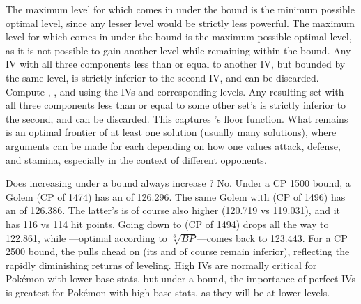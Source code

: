 The maximum level for which  comes in under the bound is the
 minimum possible optimal level, since any lesser level would be strictly less
 powerful.
The maximum level for which  comes in under the bound is the
 maximum possible optimal level, as it is not possible to gain another level
 while remaining within the bound.
Any IV with all three components less than or equal to another IV, but bounded
 by the same level, is strictly inferior to the second IV, and can be discarded.
Compute , , and \MHP{} using the IVs and corresponding levels.
Any resulting set with all three components less than or equal to some other set's
 is strictly inferior to the second, and can be discarded.
This captures \MHP{}'s floor function.
What remains is an optimal frontier of at least one solution (usually
 many solutions), where arguments can be made for each depending on how one
 values attack, defense, and stamina, especially in the context of different
 opponents.

Does increasing  under a bound always increase ? No.
Under a CP 1500 bound, a  Golem (CP of 1474) has an  of 126.296.
The same Golem with  (CP of 1496) has an  of 126.386.
The latter's  is of course also higher (120.719 vs 119.031), and it
 has 116 vs 114 hit points.
Going down to  (CP of 1494) drops all the way to 122.861,
 while ---optimal according to $\sqrt[3]{BP}$---comes back to 123.443.
For a CP 2500 bound, the  pulls ahead on  (its  and \MHP of course remain inferior),
 reflecting the rapidly diminishing returns of leveling.
High IVs are normally critical for Pokémon with lower base stats, but under a bound, the importance of perfect IVs
 is greatest for Pokémon with high base stats, as they will be at lower levels.

